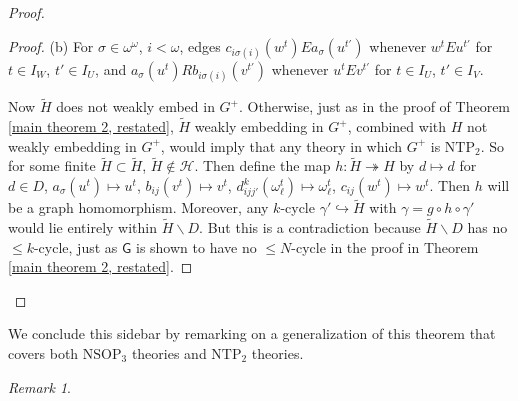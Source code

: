 \documentclass{amsart}
\theoremstyle{definition}
\theoremstyle{remark}
\newtheorem{remark}[theorem]{Remark}
\numberwithin{equation}{section}
\begin{document}
\begin{tcolorbox}
\begin{proof}
\begin{proof}
    
(b) For $\sigma \in \omega^{\omega}$, $i < \omega$, edges $c_{i \sigma(i)} (w^{t}) E a_{\sigma}(u^{t'})$ whenever $w^{t}Eu^{t'}$ for $t \in I_{W}$, $t' \in I_{U}$, and $a_{\sigma}(u^{t}) R b_{i \sigma(i)}(v^{t'})$ whenever $u^{t} E v^{t'}$ for $t \in I_{U}$, $t' \in I_{V}$.


\: Now $\widetilde{H}$ does not weakly embed in $G^{+}$. Otherwise, just as in the proof of Theorem \ref{main theorem 2, restated}, $\widetilde{H}$ weakly embedding in $G^{+}$, combined with $H$ not weakly embedding in $G^{+}$, would imply that any theory in which $G^{+}$ is $\mathrm{NTP}_{2}$. So for some finite  $\tilde{H} \subset \widetilde{H}$, $\tilde{H} \notin \mathcal{H}$. Then define the map $h: \tilde{H} \twoheadrightarrow H$ by $d \mapsto d$ for $d \in D$, $a_{\sigma}(u^{t}) \mapsto u^{t}$, $b_{ij}(v^{t}) \mapsto v^{t}$, $d^{k}_{ijj'}(\omega^{t}_{\ell}) \mapsto \omega^{t}_{\ell}$, $c_{ij}(w^{t}) \mapsto w^{t}$. Then $h$ will be a graph homomorphism. Moreover, any  $k$-cycle $\gamma' \hookrightarrow \tilde{H}$ with $\gamma = g\circ h\circ \gamma' $ would lie entirely within $\tilde{H} \backslash D$. But this is a contradiction because $\tilde{H} \backslash D$ has no $\leq k$-cycle, just as $\mathsf{G}$ is shown to have no $\leq N$-cycle in the proof in Theorem \ref{main theorem 2, restated}.





\end{proof}





 \end{proof}

 
We conclude this sidebar by remarking on a generalization of this theorem that covers both $\mathrm{NSOP}_{3}$ theories and $\mathrm{NTP}_{2}$ theories.


 \begin{remark}
    

\end{remark}
\end{tcolorbox}
\end{document}
